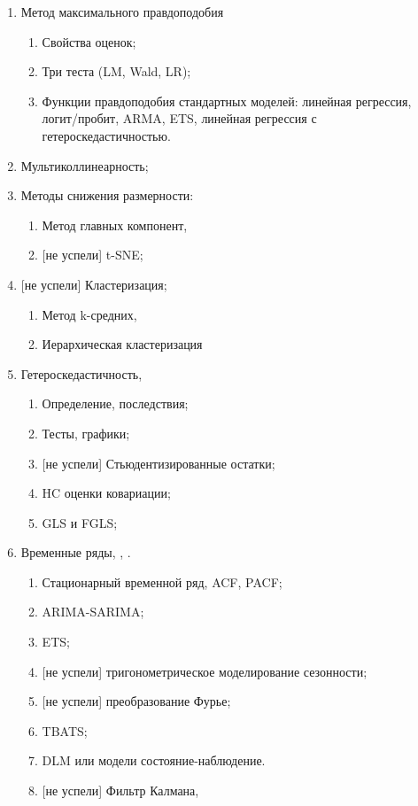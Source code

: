 \documentclass[12pt]{article}
\begin{document}
\begin{enumerate}
 \item Метод максимального правдоподобия

 \begin{enumerate}
 \item Свойства оценок;
 \item Три теста (LM, Wald, LR);
 \item Функции правдоподобия стандартных моделей: линейная регрессия, логит/пробит, ARMA, ETS,
 линейная регрессия с гетероскедастичностью.
 \end{enumerate}

 \item Мультиколлинеарность;

 \item Методы снижения размерности:
 \begin{enumerate}
   \item Метод главных компонент, \cite{decrouez2016sm}
   \item {[не успели]} t-SNE;
 \end{enumerate}


 \item {[не успели]} Кластеризация;
 \begin{enumerate}
   \item Метод k-средних, \cite{decrouez2016sm}
   \item Иерархическая кластеризация
 \end{enumerate}


 \item Гетероскедастичность,  \cite{schmidheiny2016guides}
 \begin{enumerate}
 \item Определение, последствия;
 \item Тесты, графики;
 \item {[не успели]} Стьюдентизированные остатки;
 \item HC оценки ковариации;
 \item GLS и FGLS;
 \end{enumerate}

 \item Временные ряды, \cite{hyndman2014forecasting}, \cite{van2002time}.

 \begin{enumerate}
 \item Стационарный временной ряд, ACF, PACF;
 \item ARIMA-SARIMA;
 \item ETS;
 \item {[не успели]} тригонометрическое моделирование сезонности; \cite{pollock2010lectures}
 \item {[не успели]} преобразование Фурье; \cite{3blue1brown2017fourier}
 \item TBATS;
 \item DLM или модели состояние-наблюдение.
 \item {[не успели]} Фильтр Калмана, \cite{decrouez2016sm}
 \end{enumerate}



\end{enumerate}
\end{document}
